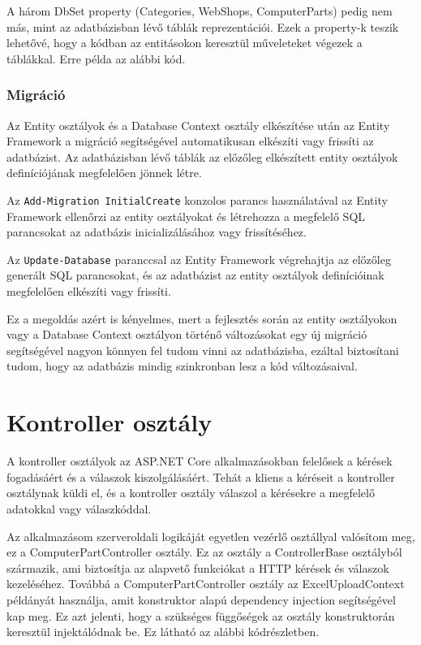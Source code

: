 \documentclass[
]{thesis-ekf}
\theoremstyle{definition}
\theoremstyle{remark}
\begin{document}
A három DbSet property (Categories, WebShops, ComputerParts) pedig nem más, mint az adatbázisban lévő táblák reprezentációi. Ezek a property-k teszik lehetővé, hogy a kódban az entitásokon keresztül műveleteket végezek a táblákkal. Erre példa az alábbi kód.



\subsubsection{Migráció}
Az Entity osztályok és a Database Context osztály elkészítése után az Entity Framework a migráció segítségével automatikusan elkészíti vagy frissíti az adatbázist. Az adatbázisban lévő táblák az előzőleg elkészített entity osztályok definíciójának megfelelően jönnek létre.

Az \texttt{Add-Migration InitialCreate} konzolos parancs használatával az Entity Framework ellenőrzi az entity osztályokat és létrehozza a megfelelő SQL parancsokat az adatbázis inicializálásához vagy frissítéséhez.

Az \texttt{Update-Database} paranccsal az Entity Framework végrehajtja az előzőleg generált SQL parancsokat, és az adatbázist az entity osztályok definícióinak megfelelően elkészíti vagy frissíti.

Ez a megoldás azért is kényelmes, mert a fejlesztés során az entity osztályokon vagy a Database Context osztályon történő változásokat egy új migráció segítségével nagyon könnyen fel tudom vinni az adatbázisba, ezáltal biztosítani tudom, hogy az adatbázis mindig szinkronban lesz a kód változásaival.	
\section{Kontroller osztály}
A kontroller osztályok az ASP.NET Core alkalmazásokban felelősek a kérések fogadásáért és a válaszok kiszolgálásáért. Tehát a kliens a kéréseit a kontroller osztálynak küldi el, és a kontroller osztály válaszol a kérésekre a megfelelő adatokkal vagy válaszkóddal.

Az alkalmazásom szerveroldali logikáját egyetlen vezérlő osztállyal valósítom meg, ez a ComputerPartController osztály. Ez az osztály a ControllerBase osztályból származik, ami biztosítja az alapvető funkciókat a HTTP kérések és válaszok kezeléséhez. Továbbá a ComputerPartController osztály az ExcelUploadContext példányát használja, amit konstruktor alapú dependency injection segítségével kap meg. Ez azt jelenti, hogy a szükséges függőségek az osztály konstruktorán keresztül injektálódnak be. Ez látható az alábbi kódrészletben.

\end{document}
